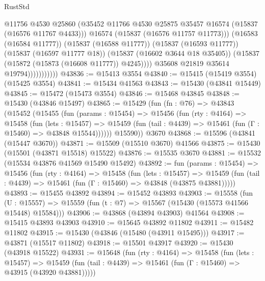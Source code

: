 \begin{lexlean}{RustStd}
\begin{coremodule}
                                @11756
                                @4530
                                @25860
                                (@35452
                                  @11766
                                  @4530
                                  @25875
                                  @35457
                                  @16574
                                  (@15837 (@16576 @11767 @4433)))
                                @16574
                                (@15837 (@16576 @11757 @11773)))
                              (@16583 (@16584 @11777))
                              (@15837 (@16588 @11777))
                              (@15837 (@16593 @11777))
                              (@15837 (@16597 @11777 @18))
                              (@15837 (@16602 @3644 @18 @35405))
                              (@15837 (@15872 (@15873 (@16608 @11777)) @4245))))
                          @35608
                          @21819
                          @35614
                          @19794)))))))))))
@43836 := @15413 @3554
@43840 := @15415 (@15419 @3554) (@15425 @3554)
@43841 := @15434 @41563
@43843 := @15430 (@43841 @15449)
@43845 := @15472 (@15473 @3554)
@43846 := @15468 @43845
@43848 := @15430 (@43846 @15497)
@43865 := @15429
    (fun (fn : @76) =>
    @43843
      (@15452
        (@15455
          (fun (params : @15454) =>
          @15456
            (fun (rty : @4164) =>
            @15458
              (fun (lets : @15457) =>
              @15459 (fun (tail : @4439) => @15461 (fun (Γ : @15460) => @43848 @15544))))))
        @15590))
    @3670
@43868 := @15596 (@43841 (@15447 @3670))
@43871 := @15509 (@15510 @3670) @41566
@43875 := @15430 (@15501 (@43871 @15518) @15522)
@43876 := @15535 @3670
@43881 := @15532 (@15534 @43876 @41569 @15490 @15492)
@43892 := fun (params : @15454) =>
  @15456
    (fun (rty : @4164) =>
    @15458
      (fun (lets : @15457) =>
      @15459 (fun (tail : @4439) => @15461 (fun (Γ : @15460) => @43848 (@43875 @43881)))))
@43893 := @15455 @43892
@43894 := @15452 @43893
@43903 := @15558
    (fun (U : @15557) => @15559 (fun (t : @7) => @15567 (@15430 (@15573 @41566 @15448) @15584)))
@43906 := @43868 (@43894 @43903) @41564
@43908 := @15415 @43893 @43903
@43910 := @15645 @43892 @11802
@43911 := @15482 @11802
@43915 := @15430 (@43846 (@15480 (@43911 @15495)))
@43917 := @43871 (@15517 @11802)
@43918 := @15501 @43917
@43920 := @15430 (@43918 @15522)
@43931 := @15648
    (fun (rty : @4164) =>
    @15458
      (fun (lets : @15457) =>
      @15459 (fun (tail : @4439) => @15461 (fun (Γ : @15460) => @43915 (@43920 @43881)))))

\end{coremodule}
\end{lexlean}
